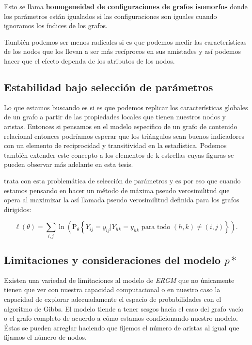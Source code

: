 Esto se llama \textbf{homogeneidad de configuraciones de grafos isomorfos} donde los parámetros están igualados si las configuraciones son iguales cuando ignoramos los índices de los grafos. 

También podemos ser menos radicales si es que podemos medir las características de los nodos que los llevan a ser más recíprocos en sus amistades y así podemos hacer que el efecto dependa de los atributos de los nodos.

\subsection{Estabilidad bajo selección de parámetros}

Lo que estamos buscando es si es que podemos replicar los características globales de un grafo a partir de las propiedades locales que tienen nuestros nodos y aristas. Entonces si pensamos en el modelo específico de un grafo de contenido relacional entonces podríamos esperar que los triángulos sean buenos indicadores con un elemento de reciprocidad y transitividad en la estadística. Podemos también extender este concepto a los elementos de k-estrellas cuyas figuras se pueden observar más adelante en esta tesis.

\cite{Snidjers2002} trata con esta problemática de selección de parámetros y es por eso que cuando estamos pensando en hacer un método de máxima pseudo verosimilitud que opera al maximizar la así llamada pseudo verosimilitud definida para los grafos dirigidos:

\begin{equation*}
    \ell(\theta)=\sum_{i, j} \ln \left(\mathrm{P}_{\theta}\left\{Y_{i j}=y_{i j} | Y_{h k}=y_{h k} \text { para todo }(h, k) \neq(i, j)\right\}\right).
\end{equation*}

\subsection{Limitaciones y consideraciones del modelo $p*$}

Existen una variedad de limitaciones al modelo de \textit{ERGM} que no únicamente tienen que ver con nuestra capacidad computacional o en nuestro caso la capacidad de explorar adecuadamente el espacio de probabilidades con el algoritmo de Gibbs. El modelo tiende a tener sesgos hacia el caso del grafo vacío o el grafo completo de acuerdo a cómo estamos condicionando nuestro modelo. Éstas se pueden arreglar haciendo que fijemos el número de aristas al igual que fijamos el número de nodos.

